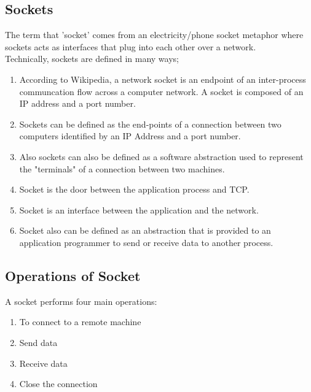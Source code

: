 \documentclass[12pt]{extarticle}
\begin{document}
\subsection{Sockets}

The term that 'socket' comes from an electricity/phone socket metaphor where sockets 
acts as interfaces that plug into each other over a network. \\
Technically, sockets are defined in many ways; \\

\begin{enumerate}[label=\textbf{\arabic*}]
    
\item According to Wikipedia, a network socket is an endpoint of an inter-process
communcation flow across a computer network. A socket is composed of an IP  address
and a port number.

\item Sockets can be defined as the end-points of a connection between two computers identified
by an IP Address and a port number.

\item Also sockets can also be defined as a software abstraction used to represent the "terminals" of a
connection between two machines.

\item Socket is the door between the application process and TCP.

\item Socket is an interface between the application and the network.

\item Socket also can be defined as an abstraction that is provided to an application programmer to send or 
receive data to another process.

\end{enumerate}

\subsection{Operations of Socket}

A socket performs four main operations:

\begin{enumerate}[label=\textbf{\arabic*}]

\item To connect to a remote machine
\item Send data
\item Receive data
\item Close the connection

\end{enumerate}
\end{document}
